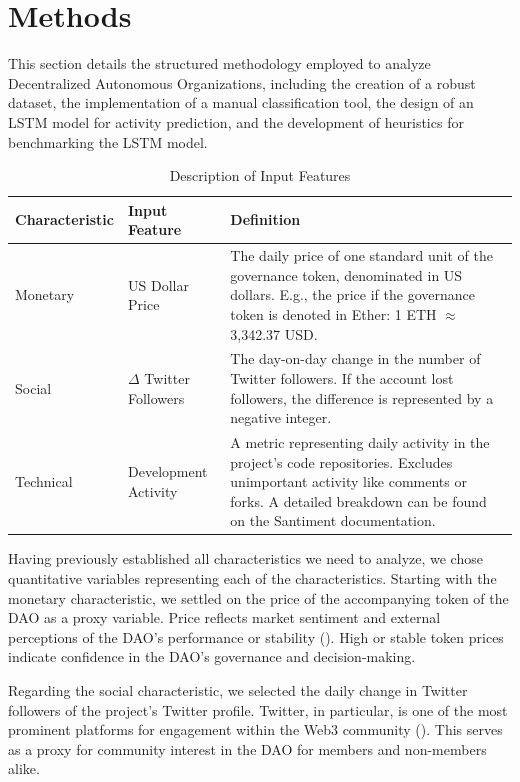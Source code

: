 \chapter{Methods}
This section details the structured methodology employed to analyze Decentralized Autonomous Organizations, including the creation of a robust dataset, the implementation of a manual classification tool, the design of an LSTM model for activity prediction, and the development of heuristics for benchmarking the LSTM model.

\begin{table}[h]
\centering
\begin{tabularx}{\textwidth}{@{}l l X@{}}
\toprule
\textbf{Characteristic}       & \textbf{Input Feature}      & \textbf{Definition}      \\ \midrule
Monetary                      & US Dollar Price             & The daily price of one standard unit of the governance token, denominated in US dollars. E.g., the price if the governance token is denoted in Ether: 1 ETH $\approx$ 3,342.37 USD. \\
Social                        & $\Delta$ Twitter Followers  & The day-on-day change in the number of Twitter followers. If the account lost followers, the difference is represented by a negative integer.         \\
Technical                     & Development Activity        & A metric representing daily activity in the project's code repositories. Excludes unimportant activity like comments or forks. A detailed breakdown can be found on the Santiment documentation. \\ \bottomrule
\end{tabularx}
\caption{Description of Input Features}
\label{tab:input_features}
\end{table}

Having previously established all characteristics we need to analyze, we chose quantitative variables representing each of the characteristics.
Starting with the monetary characteristic, we settled on the price of the accompanying token of the DAO as a proxy variable.
Price reflects market sentiment and external perceptions of the DAO's performance or stability (\cite{rahman2018sentiment}). High or stable token prices indicate confidence in the DAO's governance and decision-making.

Regarding the social characteristic, we selected the daily change in Twitter followers of the project's Twitter profile. 
Twitter, in particular, is one of the most prominent platforms for engagement within the Web3 community (\cite{deepdao2022social}).
This serves as a proxy for community interest in the DAO for members and non-members alike.

